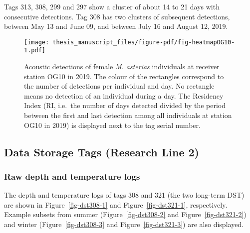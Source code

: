 \documentclass[
  authoryear,
  review,
  3p]{elsarticle}
\begin{document}
Tags 313, 308, 299 and 297 show a cluster of about 14 to 21 days with
consecutive detections. Tag 308 has two clusters of subsequent
detections, between May 13 and June 09, and between July 16 and August
12, 2019.

\begin{figure}[H]

{\centering \texttt{[image: thesis\_manuscript\_files/figure-pdf/fig-heatmapOG10-1.pdf]}

}

\caption{\label{fig-heatmapOG10}Acoustic detections of female \emph{M.
asterias} individuals at receiver station OG10 in 2019. The colour of
the rectangles correspond to the number of detections per individual and
day. No rectangle means no detection of an individual during a day. The
Residency Index (RI, i.e.~the number of days detected divided by the
period between the first and last detection among all individuals at
station OG10 in 2019) is displayed next to the tag serial number.}

\end{figure}

\hypertarget{sec-results-dst}{%
\subsection{Data Storage Tags (Research Line 2)}\label{sec-results-dst}}

\hypertarget{raw-depth-and-temperature-logs}{%
\subsubsection{Raw depth and temperature
logs}\label{raw-depth-and-temperature-logs}}

The depth and temperature logs of tags 308 and 321 (the two long-term
DST) are shown in Figure~\ref{fig-dst308-1} and
Figure~\ref{fig-dst321-1}, respectively. Example subsets from summer
(Figure~\ref{fig-dst308-2} and Figure~\ref{fig-dst321-2}) and winter
(Figure~\ref{fig-dst308-3} and Figure~\ref{fig-dst321-3}) are also
displayed.

\newpage{}
\end{document}
